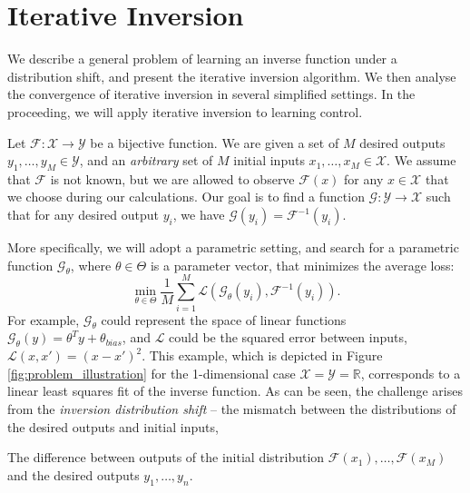 \documentclass[nohyperref]{article}
\begin{document}
\section{Iterative Inversion}\label{sec:iterative_inversion}

We describe a general problem of learning an inverse function under a distribution shift, and present the iterative inversion algorithm. We then analyse the convergence of iterative inversion in several simplified settings. In the proceeding, we will apply iterative inversion to learning control. 

Let $\mathcal{F}:\mathcal{X} \to \mathcal{Y}$ be a bijective function. We are given a set of $M$
desired outputs $y_1,\dots,y_M \in \mathcal{Y}$, and an \textit{arbitrary} set of $M$ initial inputs $x_1,\dots,x_M \in \mathcal{X}$. We assume that $\mathcal{F}$ is not known, but we are allowed to observe $\mathcal{F}(x)$ for any $x\in\mathcal{X}$ that we choose during our calculations. Our goal is to find a function $\mathcal{G}:\mathcal{Y} \to \mathcal{X}$ such that for any desired output $y_i$, we have
$
    \mathcal{G}(y_i) = \mathcal{F}^{-1}(y_i).
$

More specifically, we will adopt a parametric setting, and search for a parametric function $\mathcal{G}_\theta$, where $\theta\in \Theta$ is a parameter vector, that minimizes the average loss:
\begin{equation}\label{eq:inversion_problem}
    \min_{\theta\in\Theta} \frac{1}{M}\sum_{i=1}^{M} \mathcal{L}(\mathcal{G}_{\theta}(y_i), \mathcal{F}^{-1}(y_i)).
\end{equation}
For example, $\mathcal{G}_\theta$ could represent the space of linear functions $\mathcal{G}_\theta(y) = \theta^T y + \theta_{bias}$,
and $\mathcal{L}$ could be the squared error between inputs, $\mathcal{L}(x,x') = (x - x')^2$. This example, which is depicted in Figure \ref{fig:problem_illustration} for the 1-dimensional case $\mathcal{X}=\mathcal{Y}=\mathbb{R}$, corresponds to a linear least squares fit of the inverse function. As can be seen, the challenge arises from the \textit{inversion distribution shift} -- the mismatch between the distributions of the desired outputs and initial inputs, 
\begin{definition}\label{def:dist_shift}
The difference between outputs of the initial distribution $\mathcal{F}(x_1),\dots,\mathcal{F}(x_M)$  and the desired outputs $ y_1,\dots, y_n$.
\end{definition}
\end{document}
